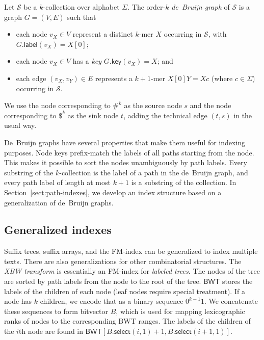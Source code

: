 \documentclass[a4paper,UKenglish]{lipics-v2016}
\newcommand{\select}{\ensuremath{\mathsf{select}}}
\newcommand{\glabel}{\ensuremath{\mathsf{label}}}
\newcommand{\gkey}{\ensuremath{\mathsf{key}}}
\newcommand{\kmer}[1]{$#1$\nobreakdash-mer}
\newcommand{\kcollection}[1]{$#1$\nobreakdash-collection}
\newcommand{\orderk}[1]{order\nobreakdash-$#1$}
\newcommand{\FMindex}{FM\nobreakdash-index}
\newcommand{\BWT}{\ensuremath{\mathsf{BWT}}}
\begin{document}
\begin{definition}
Let $\mathcal{S}$ be a \kcollection{k} over alphabet $\Sigma$. The \orderk{k} \emph{de~Bruijn graph} of $\mathcal{S}$ is a graph $G = (V, E)$ such that
\begin{itemize}
\item each node $v_{X} \in V$ represent a distinct \kmer{k} $X$ occurring in $\mathcal{S}$, with $G.\glabel(v_{X}) = X[0]$;
\item each node $v_{X} \in V$ has a \emph{key} $G.\gkey(v_{X}) = X$; and
\item each edge $(v_{X}, v_{Y}) \in E$ represents a \kmer{k+1} $X[0]Y = Xc$ (where $c \in \Sigma$) occurring in $\mathcal{S}$.
\end{itemize}
We use the node corresponding to $\#^{k}$ as the source node $s$ and the node corresponding to $\$^{k}$ as the sink node $t$, adding the technical edge $(t, s)$ in the usual way.
\end{definition}

De~Bruijn graphs have several properties that make them useful for indexing purposes. Node keys prefix-match the labels of all paths starting from the node. This makes it possible to sort the nodes unambiguously by path labels. Every substring of the \kcollection{k} is the label of a path in the de~Bruijn graph, and every path label of length at most $k+1$ is a substring of the collection. In Section~\ref{sect:path-indexes}, we develop an index structure based on a generalization of de~Bruijn graphs.

\subsection{Generalized indexes}

Suffix trees, suffix arrays, and the \FMindex{} can be generalized to index multiple texts. There are also generalizations for other combinatorial structures. The \emph{XBW transform} \cite{Ferragina2009b} is essentially an \FMindex{} for \emph{labeled trees}. The nodes of the tree are sorted by path labels from the node to the root of the tree. $\BWT$ stores the labels of the children of each node (leaf nodes require special treatment). If a node has $k$ children, we encode that as a binary sequence $0^{k-1} 1$. We concatenate these sequences to form bitvector $B$, which is used for mapping lexicographic ranks of nodes to the corresponding BWT ranges. The labels of the children of the $i$th node are found in $\BWT[B.\select(i, 1) + 1, B.\select(i + 1, 1)]$.
\end{document}

